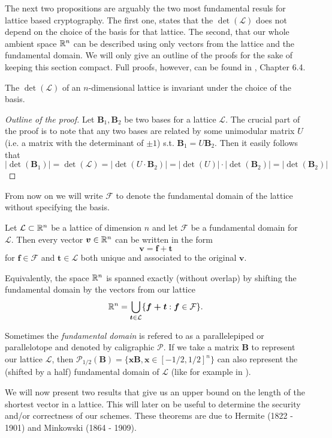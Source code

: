 The next two propositions are arguably the two most fundamental resuls for lattice based cryptography. The first one, states that the $\det (\mathcal{L})$ does not depend on the choice of the basis for that lattice. The second, that our whole ambient space $\mathbb{R}^n$ can be described using only vectors from the lattice and the fundamental domain. We will only give an outline of the proofs for the sake of keeping this section compact. Full proofs, however, can be found in \cite{book}, Chapter 6.4.

\begin{lemma}
    The $\det (\mathcal{L})$ of an $n$-dimensional lattice is invariant under the choice of the basis.
\end{lemma}

\begin{proof}[Outline of the proof]
    Let $\bm{B}_1, \bm{B}_2$ be two bases for a lattice $\mathcal{L}$. The crucial part of the proof is to note that any two bases are related by some unimodular matrix $U$ (i.e. a matrix with the determinant of $\pm 1$) s.t. $\bm{B}_1 = U \bm{B}_2$. Then it easily follows that 
	\[| \det (\bm{B}_1) | = \det (\mathcal{L}) = | \det (U \cdot \bm{B}_2) | = | \det(U) | \cdot | \det(\bm{B}_2) | = | \det(\bm{B}_2)| \]
\end{proof}

From now on we will write $\mathcal{F}$ to denote the fundamental domain of the lattice without specifying the basis.

\begin{proposition}
    Let $\mathcal{L} \subset \mathbb{R}^n$ be a lattice of dimension $n$ and let $\mathcal{F}$ be a fundamental domain for $\mathcal{L}$. Then every vector $\boldsymbol{v} \in \mathbb{R}^n$ can be written in the form 
	\[\bm{v} = \bm{f} + \bm{t}\]
    for $\bm{f} \in \mathcal{F}$ and $\bm{t} \in \mathcal{L}$ both unique and associated to the original $\bm{v}$.
\end{proposition}

Equivalently, the space $\mathbb{R}^n$ is spanned exactly (without overlap) by shifting the fundamental domain by the vectors from our lattice
\[ \mathbb{R}^n = \bigcup_{\boldsymbol{t} \in \mathcal{L}} \{\boldsymbol{f + t} : \boldsymbol{f} \in \mathcal{F} \}.\]

\begin{remark}
    Sometimes the \textit{fundamental domain} is refered to as a parallelepiped or parallelotope and denoted by caligraphic $\mathcal{P}$. If we take a matrix $\bm{B}$ to represent our lattice $\mathcal{L}$, then $\mathcal{P}_{1/2}(\bm{B}) = \{\bm{x}\bm{B}, \bm{x} \in [-1/2, 1/2]^n \}$ can also represent the (shifted by a half) fundamental domain of $\mathcal{L}$ (like for example in \cite{gentry}).
\end{remark}
\iffalse
We will now present two results that give us an upper bound on the length of the shortest vector in a lattice. This will later on be useful to determine the security and/or correctness of our schemes. These theorems are due to Hermite (1822 - 1901) and Minkowski (1864 - 1909).

